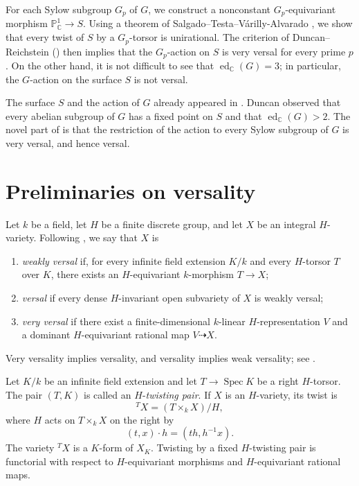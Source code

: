 \documentclass{amsart}
\theoremstyle{definition}
\theoremstyle{remark}
\numberwithin{equation}{section}
\newcommand{\C}{\mathbb C}
\newcommand{\Spec}{\operatorname{Spec}}
\newcommand{\ed}{\operatorname{ed}}
\begin{document}
For each Sylow subgroup $G_p$ of $G$, we construct a nonconstant $G_p$-equivariant morphism $\mathbb P^1_\C\to S$. Using a theorem of Salgado--Testa--V\'arilly-Alvarado \cite[Theorem~17]{Salgado-Testa-VA}, we show that every twist of $S$ by a $G_p$-torsor is unirational. The criterion of Duncan--Reichstein () then implies that the $G_p$-action on $S$ is very versal for every prime $p$. On the other hand, it is not difficult to see that $\ed_{\C}(G)=3$; in particular, the $G$-action on the surface $S$ is not versal.

The surface $S$ and the action of $G$ already appeared in
\cite[Example~1.9]{Duncan-delPezzo}. Duncan observed that every abelian
subgroup of $G$ has a fixed point on $S$ and that $\ed_{\C}(G)>2$. The novel part of  is that the restriction of the action to every Sylow subgroup of $G$ is very versal, and hence versal.




\section{Preliminaries on versality}\label{sec:prelim}

Let $k$ be a field, let $H$ be a finite discrete group, and let $X$ be an
integral $H$-variety. Following \cite{Duncan-Reichstein}, we say
that $X$ is
\begin{enumerate}[label=\textup{(\roman*)}]
 \item \emph{weakly versal} if, for every infinite field extension $K/k$
 and every $H$-torsor $T$ over $K$, there exists an $H$-equivariant
 $k$-morphism $T\to X$;
 \item \emph{versal} if every dense $H$-invariant open subvariety of $X$ is
 weakly versal;
 \item \emph{very versal} if there exist a finite-dimensional $k$-linear
 $H$-representation $V$ and a dominant $H$-equivariant rational map
 $V\dashrightarrow X$.
\end{enumerate}

Very versality implies versality, and versality implies weak versality; see
\cite[Equation~(1.1)]{Duncan-Reichstein}.

Let $K/k$ be an infinite field extension and let $T\to\Spec K$ be a right
$H$-torsor. The pair $(T,K)$ is called an $H$-\emph{twisting pair}. If $X$
is an $H$-variety, its twist is
\[
 {}^T\!X=(T\times_k X)/H,
\]
where $H$ acts on $T\times_kX$ on the right by
\[
 (t,x)\cdot h=(th,h^{-1}x).
\]
The variety ${}^T\!X$ is a $K$-form of $X_K$. Twisting by a fixed $H$-twisting pair is functorial with respect to $H$-equivariant morphisms and $H$-equivariant rational maps.
\end{document}
